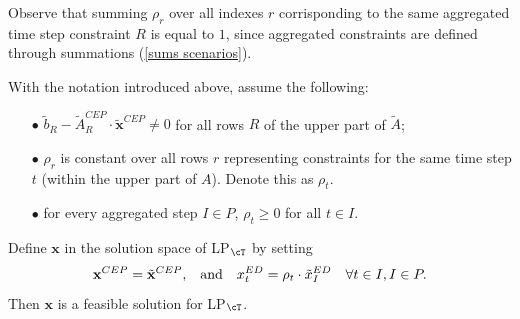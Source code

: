 \documentclass[smallextended,natbib]{svjour3}       %
\numberwithin{theorem}{section}
\begin{document}
Observe that summing $\rho_r$ over all indexes $r$ corrisponding to the same aggregated time step constraint $R$ is equal to $1$, since aggregated constraints are defined through summations (\ref{sums scenarios}).


\begin{proposition}\label{prop rho}
  With the notation introduced above, assume the following:
  \begin{itemize}
  \item[$\bullet$]  $\tilde{b}_R-\tilde{A}_R^{CEP}\cdot\tilde{\mathbf{x}}^{CEP}\neq0$ for all rows $R$ of the upper part of $\tilde{A}$;
  \item[$\bullet$] $\rho_r$ is constant over %
  all rows $r$ representing constraints for the same time step $t$ (within the upper part of $A$). Denote this as $\rho_t$.
  \item[$\bullet$] for every aggregated step $I\in P$,  $\rho_t\ge0$ for all $t\in I$. 
  \end{itemize}
  Define $\mathbf{x}$ in the solution space of LP$_{\cT}$ by setting 
  \[ \mathbf{x}^{CEP} = \tilde{\mathbf{x}}^{CEP}\text{,\quad and\quad} x^{ED}_t = \rho_t\cdot \tilde{x}^{ED}_I \quad \forall t\in I, I\in P.\]
  Then $\mathbf{x}$ is a feasible solution for LP$_{\cT}$.
\end{proposition}
\end{document}

